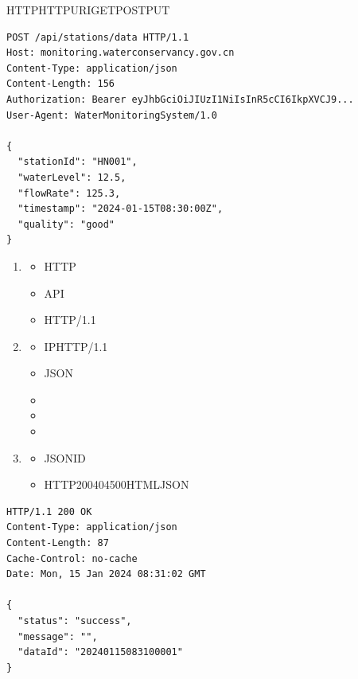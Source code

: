 HTTPHTTPURIGETPOSTPUT

\begin{lstlisting}
POST /api/stations/data HTTP/1.1
Host: monitoring.waterconservancy.gov.cn
Content-Type: application/json
Content-Length: 156
Authorization: Bearer eyJhbGciOiJIUzI1NiIsInR5cCI6IkpXVCJ9...
User-Agent: WaterMonitoringSystem/1.0

{
  "stationId": "HN001",
  "waterLevel": 12.5,
  "flowRate": 125.3,
  "timestamp": "2024-01-15T08:30:00Z",
  "quality": "good"
}
\end{lstlisting}


\begin{enumerate}
\def\labelenumi{\arabic{enumi}.}
\item
  \important{}

  \begin{itemize}
  \tightlist
  \item
    HTTP
  \item
    API
  \item
    HTTP/1.1
  \end{itemize}
\item
  \important{}

  \begin{itemize}
  \item
    IPHTTP/1.1
  \item
    JSON
  \item
  \item
  \item
  \end{itemize}
\item
  \important{}

  \begin{itemize}
  \tightlist
  \item
    JSONID
  \item
    HTTP200404500HTMLJSON
  \end{itemize}
\end{enumerate}

\begin{lstlisting}
HTTP/1.1 200 OK
Content-Type: application/json
Content-Length: 87
Cache-Control: no-cache
Date: Mon, 15 Jan 2024 08:31:02 GMT

{
  "status": "success",
  "message": "",
  "dataId": "20240115083100001"
}
\end{lstlisting}

